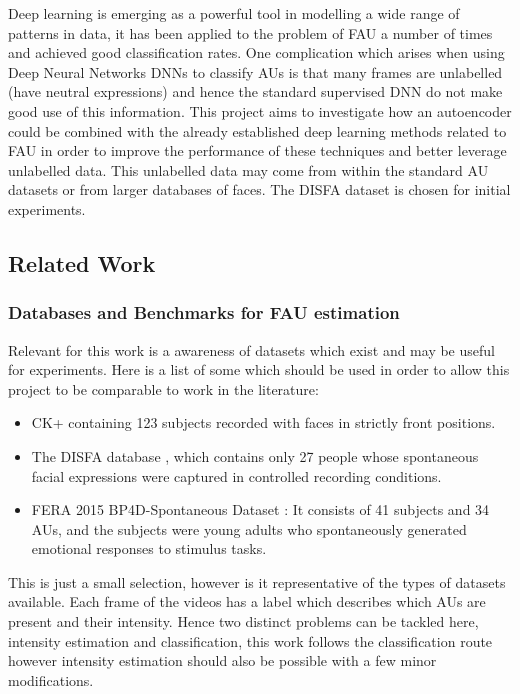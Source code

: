 \documentclass[9pt]{article} \usepackage{amsmath, amsthm, amssymb}
\begin{document}
Deep learning is emerging as a powerful tool in modelling a wide range of patterns
in data, it has been applied to the problem of FAU a number of times and achieved
good classification rates. One complication which arises when using Deep Neural
Networks DNNs to classify AUs is that many frames are unlabelled (have neutral expressions)
and hence the standard supervised DNN do not make good use of this information.
This project aims to investigate how an autoencoder could be combined with the
already established deep learning methods related to FAU in order to improve the performance
of these techniques and better leverage unlabelled data. This unlabelled data may
come from within the standard AU datasets or from larger databases of faces.
The DISFA dataset is chosen for initial experiments.

\subsection{Related Work}

\subsubsection{Databases and Benchmarks for FAU estimation}
Relevant for this work is a awareness of datasets which exist and may be useful
for experiments. Here is a list of some which should be used in order to allow
this project to be comparable to work in the literature:

\begin{itemize}
    \item CK+ \cite{Lucey2010} containing 123 subjects recorded with faces in strictly front positions.
    \item The DISFA database \cite{disfa}, which contains only 27 people whose spontaneous
          facial expressions were captured in controlled recording conditions.
    \item FERA 2015 BP4D-Spontaneous Dataset \cite{Valstar}:
          It consists of 41 subjects and 34 AUs, and the subjects were young adults who
          spontaneously generated emotional responses to stimulus tasks.
\end{itemize}

This is just a small selection, however is it representative of the types of
datasets available. Each frame of the videos has a label which describes which AUs are
present and their intensity. Hence two distinct problems can be tackled here, intensity
estimation and classification, this work follows the classification route however
intensity estimation should also be possible with a few minor modifications.
\end{document}
